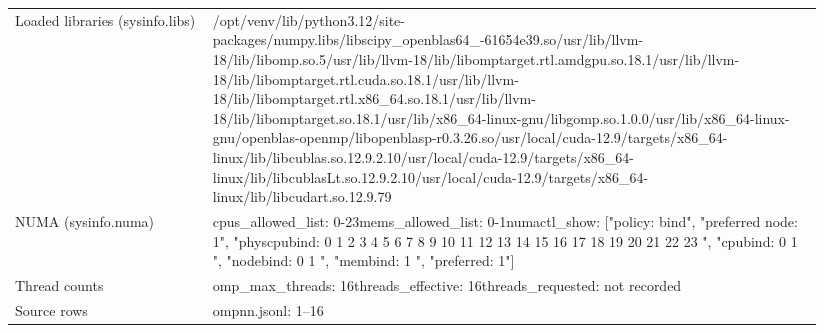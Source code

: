 \begin{longtable}{>{\raggedright\arraybackslash}p{0.23\linewidth}>{\raggedright\arraybackslash}p{0.71\linewidth}}
Loaded libraries (sysinfo.libs) & /\allowbreak{}opt/\allowbreak{}venv/\allowbreak{}lib/\allowbreak{}python3.12/\allowbreak{}site-packages/\allowbreak{}numpy.libs/\allowbreak{}libscipy\_\allowbreak{}openblas64\_\allowbreak{}-61654e39.so\newline /\allowbreak{}usr/\allowbreak{}lib/\allowbreak{}llvm-18/\allowbreak{}lib/\allowbreak{}libomp.so.5\newline /\allowbreak{}usr/\allowbreak{}lib/\allowbreak{}llvm-18/\allowbreak{}lib/\allowbreak{}libomptarget.rtl.amdgpu.so.18.1\newline /\allowbreak{}usr/\allowbreak{}lib/\allowbreak{}llvm-18/\allowbreak{}lib/\allowbreak{}libomptarget.rtl.cuda.so.18.1\newline /\allowbreak{}usr/\allowbreak{}lib/\allowbreak{}llvm-18/\allowbreak{}lib/\allowbreak{}libomptarget.rtl.x86\_\allowbreak{}64.so.18.1\newline /\allowbreak{}usr/\allowbreak{}lib/\allowbreak{}llvm-18/\allowbreak{}lib/\allowbreak{}libomptarget.so.18.1\newline /\allowbreak{}usr/\allowbreak{}lib/\allowbreak{}x86\_\allowbreak{}64-linux-gnu/\allowbreak{}libgomp.so.1.0.0\newline /\allowbreak{}usr/\allowbreak{}lib/\allowbreak{}x86\_\allowbreak{}64-linux-gnu/\allowbreak{}openblas-openmp/\allowbreak{}libopenblasp-r0.3.26.so\newline /\allowbreak{}usr/\allowbreak{}local/\allowbreak{}cuda-12.9/\allowbreak{}targets/\allowbreak{}x86\_\allowbreak{}64-linux/\allowbreak{}lib/\allowbreak{}libcublas.so.12.9.2.10\newline /\allowbreak{}usr/\allowbreak{}local/\allowbreak{}cuda-12.9/\allowbreak{}targets/\allowbreak{}x86\_\allowbreak{}64-linux/\allowbreak{}lib/\allowbreak{}libcublasLt.so.12.9.2.10\newline /\allowbreak{}usr/\allowbreak{}local/\allowbreak{}cuda-12.9/\allowbreak{}targets/\allowbreak{}x86\_\allowbreak{}64-linux/\allowbreak{}lib/\allowbreak{}libcudart.so.12.9.79 \\
NUMA (sysinfo.numa) & cpus\_\allowbreak{}allowed\_\allowbreak{}list: 0-23\newline mems\_\allowbreak{}allowed\_\allowbreak{}list: 0-1\newline numactl\_\allowbreak{}show: ["policy: bind", "preferred node: 1", "physcpubind: 0 1 2 3 4 5 6 7 8 9 10 11 12 13 14 15 16 17 18 19 20 21 22 23 ", "cpubind: 0 1 ", "nodebind: 0 1 ", "membind: 1 ", "preferred: 1"] \\
Thread counts & omp\_\allowbreak{}max\_\allowbreak{}threads: 16\newline threads\_\allowbreak{}effective: 16\newline threads\_\allowbreak{}requested: not recorded \\
Source rows & ompnn.jsonl: 1–16 \\
\end{longtable}
